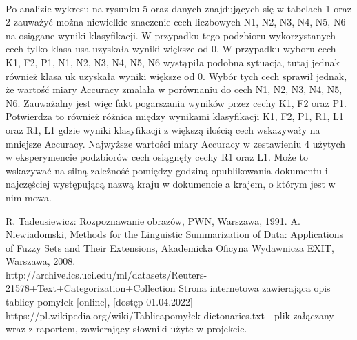 \documentclass{classrep}
\begin{document}
\\
Po analizie wykresu na rysunku 5 oraz danych znajdujących się w tabelach 1 oraz 2 zauważyć można niewielkie znaczenie cech liczbowych N1, N2, N3, N4, N5, N6 na osiągane wyniki klasyfikacji. W przypadku tego podzbioru wykorzystanych cech tylko klasa usa uzyskała wyniki większe od 0. W przypadku wyboru cech K1, F2, P1, N1, N2, N3, N4, N5, N6 wystąpiła podobna sytuacja, tutaj jednak również klasa uk uzyskała wyniki większe od 0. Wybór tych cech sprawił jednak, że wartość miary Accuracy zmalała w porównaniu do cech N1, N2, N3, N4, N5, N6. Zauważalny jest więc fakt pogarszania wyników przez cechy K1, F2 oraz P1. Potwierdza to również różnica między wynikami klasyfikacji K1, F2, P1, R1, L1 oraz R1, L1 gdzie wyniki klasyfikacji z większą ilością cech wskazywały na mniejsze Accuracy. Najwyższe wartości miary Accuracy w zestawieniu 4 użytych w eksperymencie podzbiorów cech osiągnęły cechy R1 oraz L1. Może to wskazywać na silną zależność pomiędzy godziną opublikowania dokumentu i najczęściej występującą nazwą kraju w dokumencie a krajem, o którym jest w nim mowa.

\begin{thebibliography}{0}
 R. Tadeusiewicz: Rozpoznawanie obrazów, PWN, Warszawa, 1991.  
 A. Niewiadomski, Methods for the Linguistic Summarization of Data: Applications of Fuzzy Sets and Their Extensions, Akademicka Oficyna Wydawnicza EXIT, Warszawa, 2008.
  \\ 
http://archive.ics.uci.edu/ml/datasets/Reuters-21578+Text+Categorization+Collection
 Strona internetowa zawierająca opis tablicy pomyłek [online], [dostęp 01.04.2022] https://pl.wikipedia.org/wiki/Tablica\textunderscore pomyłek
 dictonaries.txt - plik załączany wraz z raportem, zawierający słowniki użyte w projekcie.
\end{thebibliography}

\end{document}
